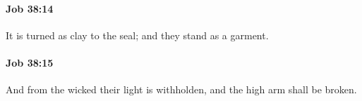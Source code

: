 		\paragraph{Job 38:14} %
			\label{JOB-38-14}

			It is turned as clay to the seal; and they stand as a garment.


		\paragraph{Job 38:15} %
			\label{JOB-38-15}

			And from the wicked their light is withholden, and the high arm shall be broken.


